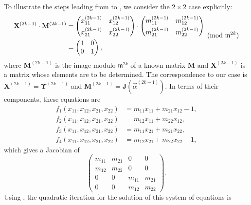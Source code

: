 To illustrate the steps leading from  to
, we consider the $2 \times 2$ case explicitly:
\[
\begin{aligned}
\mathbf{X}^{(2k-1)} \cdot \mathbf{M}^{(2k-1)} 
& = 
\begin{pmatrix}x_{11}^{(2k-1)} & x_{12}^{(2k-1)} \\\noalign{\vskip3pt}
x_{21}^{(2k-1)} & x_{22}^{(2k-1)} \end{pmatrix} 
\cdot
\begin{pmatrix}m_{11}^{(2k-1)} & m_{12}^{(2k-1)} \\\noalign{\vskip3pt}
m_{21}^{(2k-1)} & m_{22}^{(2k-1)} \end{pmatrix} \\
& = \begin{pmatrix}1& 0 \\ 0 & 1 \end{pmatrix},
\end{aligned}
\pmod{\mathfrak{m}^{2k}}
\]
where $\mathbf{M}^{(2k-1)}$ is the image modulo $\mathfrak{m}^{2k}$ of a
known matrix $\mathbf{M}$ and $\mathbf{X}^{(2k-1)}$ is a matrix whose elements
are to be determined.  The correspondence to our case is
$\mathbf{X}^{(2k-1)} = \mathbf{\Upsilon}^{(2k-1)}$ and $\mathbf{M}^{(2k-1)} =
\mathbf{J}(\vec{\alpha}^{(2k-1)})$. In terms of their components, these
equations are 
\[
\begin{aligned}
 f_1(x_{11}, x_{12}, x_{21}, x_{22}) & 
   = m_{11} x_{11} + m_{21} x_{12} - 1, \\
 f_2(x_{11}, x_{12}, x_{21}, x_{22}) & 
   = m_{12} x_{11} + m_{22} x_{12}, \\ 
 f_3(x_{11}, x_{12}, x_{21}, x_{22}) & 
   = m_{11} x_{21} + m_{21} x_{22}, \\ 
 f_4(x_{11}, x_{12}, x_{21}, x_{22}) & 
   = m_{12} x_{21} + m_{22} x_{22} - 1,
\end{aligned}
\]
which gives a Jacobian of 
\[
\begin{pmatrix}
   m_{11} & m_{21} & 0 & 0 \\
   m_{12} & m_{22} & 0 & 0 \\
   0 & 0 & m_{11} & m_{21} \\
   0 & 0 & m_{12} & m_{22} \end{pmatrix}.
\]
Using , the quadratic iteration for the solution
of this system of equations is
